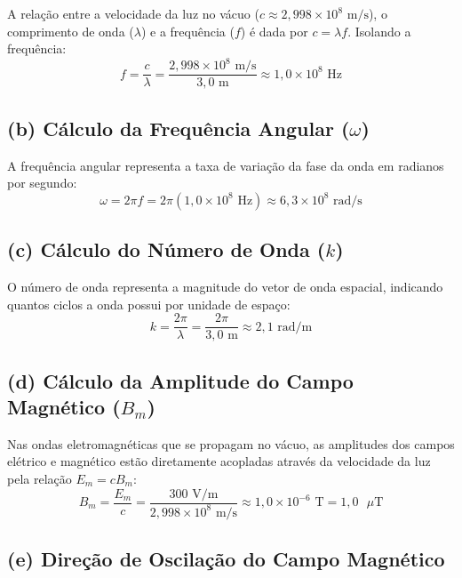 \documentclass[12pt,a4paper]{article}
\begin{document}
A relação entre a velocidade da luz no vácuo ($c \approx 2,998 \times 10^8\text{ m/s}$), o comprimento de onda ($\lambda$) e a frequência ($f$) é dada por $c = \lambda f$. Isolando a frequência:
\begin{equation*}
f = \frac{c}{\lambda} = \frac{2,998 \times 10^8\text{ m/s}}{3,0\text{ m}} \approx 1,0 \times 10^8\text{ Hz}
\end{equation*}

\subsection*{(b) Cálculo da Frequência Angular ($\omega$)}

A frequência angular representa a taxa de variação da fase da onda em radianos por segundo:
\begin{equation*}
\omega = 2\pi f = 2\pi (1,0 \times 10^8\text{ Hz}) \approx 6,3 \times 10^8\text{ rad/s}
\end{equation*}

\subsection*{(c) Cálculo do Número de Onda ($k$)}

O número de onda representa a magnitude do vetor de onda espacial, indicando quantos ciclos a onda possui por unidade de espaço:
\begin{equation*}
k = \frac{2\pi}{\lambda} = \frac{2\pi}{3,0\text{ m}} \approx 2,1\text{ rad/m}
\end{equation*}

\subsection*{(d) Cálculo da Amplitude do Campo Magnético ($B_m$)}

Nas ondas eletromagnéticas que se propagam no vácuo, as amplitudes dos campos elétrico e magnético estão diretamente acopladas através da velocidade da luz pela relação $E_m = c B_m$:
\begin{equation*}
B_m = \frac{E_m}{c} = \frac{300\text{ V/m}}{2,998 \times 10^8\text{ m/s}} \approx 1,0 \times 10^{-6}\text{ T} = 1,0\text{ }\mu\text{T}
\end{equation*}

\subsection*{(e) Direção de Oscilação do Campo Magnético}
\end{document}
